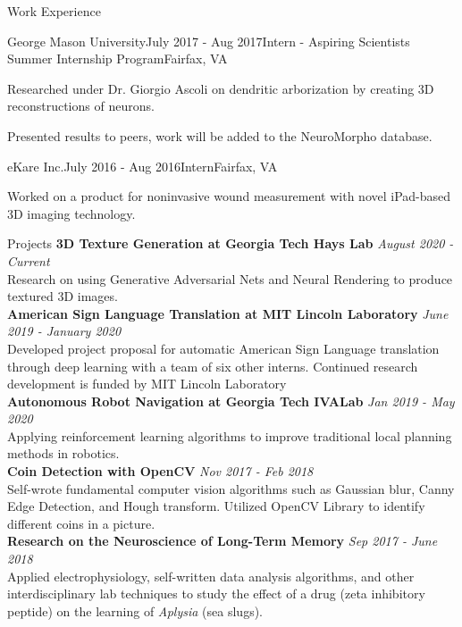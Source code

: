 \documentclass{template} %
\begin{document}
\begin{rSection}{Work Experience}
\begin{rSubsection}{George Mason University}{July 2017 - Aug 2017}{Intern - Aspiring Scientists Summer Internship Program}{Fairfax, VA}
\item Researched under Dr. Giorgio Ascoli on dendritic arborization by creating 3D reconstructions of neurons.
\item Presented results to peers, work will be added to the NeuroMorpho database.
\end{rSubsection}

\begin{rSubsection}{eKare Inc.}{July 2016 - Aug 2016}{Intern}{Fairfax, VA}
\item Worked on a product for noninvasive wound measurement with novel iPad-based 3D imaging technology.
\end{rSubsection}

\end{rSection}

\newpage

\begin{rSection}{Projects}
{\bf 3D Texture Generation at Georgia Tech Hays Lab} \hfill {\em August 2020 - Current} \smallskip
\\Research on using Generative Adversarial Nets and Neural Rendering to produce textured 3D images. \vspace{3mm} \\
{\bf American Sign Language Translation at MIT Lincoln Laboratory} \hfill {\em June 2019 - January 2020} \smallskip
\\Developed project proposal for automatic American Sign Language translation through deep learning with a team of six other interns. Continued research development is funded by MIT Lincoln Laboratory  \vspace{3mm} \\
{\bf Autonomous Robot Navigation at Georgia Tech IVALab} \hfill {\em Jan 2019 - May 2020} \smallskip
\\Applying reinforcement learning algorithms to improve traditional local planning methods in robotics. \vspace{3mm} \\
{\bf Coin Detection with OpenCV} \hfill {\em Nov 2017 - Feb 2018} \smallskip
\\Self-wrote fundamental computer vision algorithms such as
Gaussian blur, Canny Edge Detection, and Hough transform. Utilized OpenCV Library to identify different coins in a picture. \vspace{3mm} \\
{\bf Research on the Neuroscience of Long-Term Memory} \hfill {\em Sep 2017 - June 2018} \smallskip
\\Applied electrophysiology, self-written data analysis algorithms, and other interdisciplinary lab techniques to study the effect of a drug (zeta inhibitory peptide) on the learning of {\em Aplysia} (sea slugs).
\end{rSection}
\end{document}
